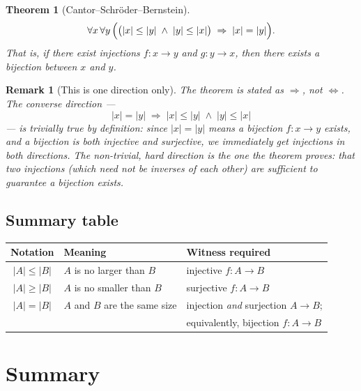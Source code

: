\documentclass[11pt]{article}
\theoremstyle{defstyle}
\theoremstyle{thmstyle}
\newtheorem{theorem}{Theorem}[section]
\theoremstyle{notstyle}
\newtheorem*{remark}{Remark}
\theoremstyle{cautionstyle}
\begin{document}
\begin{thmbox}
\begin{theorem}[Cantor--Schr\"{o}der--Bernstein]
\[
  \forall x\, \forall y\,\Bigl(\bigl(|x| \leq |y| \;\wedge\; |y| \leq |x|\bigr) \;\Rightarrow\; |x| = |y|\Bigr).
\]
That is, if there exist injections $f: x \to y$ and $g: y \to x$, then there exists a bijection between $x$ and $y$.
\end{theorem}
\end{thmbox}

\begin{notebox}
\begin{remark}[This is one direction only]
The theorem is stated as $\Rightarrow$, not $\iff$.  The converse direction —
\[
  |x| = |y| \;\Rightarrow\; |x| \leq |y| \;\wedge\; |y| \leq |x|
\]
— is \emph{trivially true by definition}: since $|x|=|y|$ means a bijection $f: x \to y$ exists, and a bijection is both injective and surjective, we immediately get injections in both directions.  The non-trivial, hard direction is the one the theorem proves: that \emph{two injections} (which need not be inverses of each other) are sufficient to guarantee a bijection exists.
\end{remark}
\end{notebox}

\subsection{Summary table}

\begin{center}
\renewcommand{\arraystretch}{1.6}
\begin{tabular}{|c|l|l|}
\hline
\textbf{Notation} & \textbf{Meaning} & \textbf{Witness required} \\
\hline
$|A| \leq |B|$ & $A$ is no larger than $B$ & injective $f: A \to B$ \\
$|A| \geq |B|$ & $A$ is no smaller than $B$ & surjective $f: A \to B$ \\
$|A| = |B|$ & $A$ and $B$ are the same size & injection \emph{and} surjection $A \to B$; \\
             &                               & equivalently, bijection $f: A \to B$ \\
\end{tabular}
\end{center}

\section{Summary}
\end{document}
